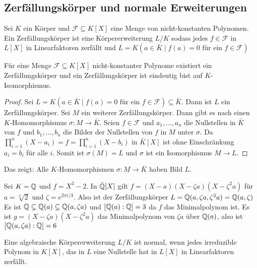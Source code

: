 \subsection{Zerfällungskörper und normale Erweiterungen}
\begin{Def}
    Sei \(K\) ein Körper und \(\mathcal F\subseteq K[X]\) eine Menge von nicht-konstanten Polynomen. Ein Zerfällungskörper ist eine Körpererweiterung \(L/K\) sodass jedes \(f\in\mathcal F\) in \(L[X]\) in Linearfaktoren zerfällt und \(L=K(a\in\bar K\mid f(a)=0 \text{ für ein } f\in\mathcal F)\)
\end{Def}
\begin{Lemma}
    Für eine Menge \(\mathcal F\subseteq K[X]\) nicht-konstanter Polynome existiert ein Zer\-fäl\-lungs\-kör\-per und ein Zer\-fäl\-lungs\-kör\-per ist eindeutig bist auf \(K\)-Isomorphismus.
\end{Lemma}
\begin{proof}
    Sei \(L=K(a\in\bar K\mid f(a)=0 \text{ für ein } f\in\mathcal F)\subseteq \bar K\). Dann ist \(L\) ein Zerfällungskörper.
    Sei \(M\) ein weiterer Zerfällungskörper. Dann gibt es nach  einen \(K\)-Homomorphismus \(\sigma\colon M\to\bar K\). Seien \(f\in\mathcal F\) und \(a_1,\dots, a_n\) die Nullstellen in \(\bar K\) von \(f\) und \(b_1,\dots,b_n\) die Bilder der Nullstellen von \(f\) in \(M\) unter \(\sigma\).
    Da \(\prod_{i=1}^n(X-a_i)=f=\prod_{i=1}^n(X-b_i)\) in \(\bar K[X]\) ist ohne Einschränkung \(a_i=b_i\) für alle \(i\). Somit ist \(\sigma(M)=L\) und \(\sigma\) ist ein Isomorphismus \(M\to L\).
\end{proof}
\begin{Bem}
    Das zeigt: Alle \(K\)-Homomorphismen \(\sigma\colon M\to \bar K\) haben Bild \(L\).
\end{Bem}
\begin{Bsp}
    Sei \(K=\mathbb{Q}\) und \(f=X^3-2\). In \(\bar{\mathbb{Q}}[X]\) gilt \(f=(X-a)(X-\zeta a)(X-\zeta^2a)\) für \(a=\sqrt[3]{2}\) und \(\zeta=e^{2\pi i/3}\).
    Also ist der Zerfällungskörper \(L=\mathbb{Q}(a,\zeta a,\zeta^2 a)=\mathbb{Q}(a,\zeta)\)
    Es ist \(\mathbb{Q}\subsetneq \mathbb{Q}(a)\subsetneq \mathbb{Q}(a,\zeta a)\) und \([\mathbb{Q}(a):\mathbb{Q}]=3\) da \(f\) das Minimalpolynom ist. Es ist \(g=(X-\zeta a)(X-\zeta^2 a)\) das Minimalpolynom von \(\zeta a\) über \(\mathbb{Q}(a)\), also ist \([\mathbb{Q}(a,\zeta a):\mathbb{Q}]=6\)
\end{Bsp}
\begin{Def}
    Eine algebraische Körpererweiterung \(L/K\) ist normal, wenn jedes irreduzible Polynom in \(K[X]\), das in \(L\) eine Nullstelle hat in \(L[X]\) in Linearfaktoren zerfällt.
\end{Def}
